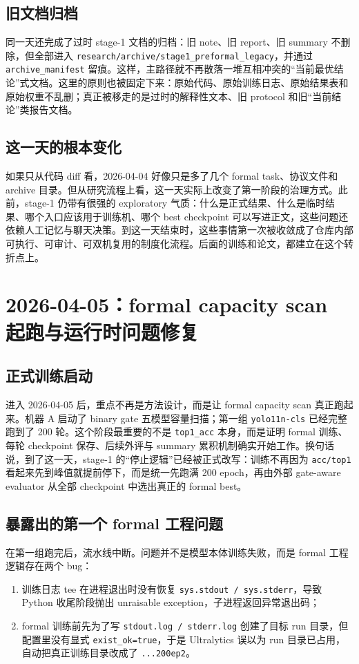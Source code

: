 \documentclass[UTF8,12pt]{ctexart}
\newcommand{\reportdate}[1]{\section{#1}}
\begin{document}
\subsection{旧文档归档}
同一天还完成了过时 stage-1 文档的归档：旧 note、旧 report、旧 summary 不删除，但全部进入 \texttt{research/archive/stage1\_preformal\_legacy}，并通过 \texttt{archive\_manifest} 留痕。这样，主路径就不再散落一堆互相冲突的“当前最优结论”式文档。这里的原则也被固定下来：原始代码、原始训练日志、原始结果表和原始权重不乱删；真正被移走的是过时的解释性文本、旧 protocol 和旧“当前结论”类报告文档。

\subsection{这一天的根本变化}
如果只从代码 diff 看，2026-04-04 好像只是多了几个 formal task、协议文件和 archive 目录。但从研究流程上看，这一天实际上改变了第一阶段的治理方式。此前，stage-1 仍带有很强的 exploratory 气质：什么是正式结果、什么是临时结果、哪个入口应该用于训练机、哪个 best checkpoint 可以写进正文，这些问题还依赖人工记忆与聊天决策。到这一天结束时，这些事情第一次被收敛成了仓库内部可执行、可审计、可双机复用的制度化流程。后面的训练和论文，都建立在这个转折点上。

\reportdate{2026-04-05：formal capacity scan 起跑与运行时问题修复}

\subsection{正式训练启动}
进入 2026-04-05 后，重点不再是方法设计，而是让 formal capacity scan 真正跑起来。机器 A 启动了 binary gate 五模型容量扫描；第一组 \texttt{yolo11n-cls} 已经完整跑到了 200 轮。这个阶段最重要的不是 \texttt{top1\_acc} 本身，而是证明 formal 训练、每轮 checkpoint 保存、后续外评与 summary 累积机制确实开始工作。换句话说，到了这一天，stage-1 的“停止逻辑”已经被正式改写：训练不再因为 \texttt{acc/top1} 看起来先到峰值就提前停下，而是统一先跑满 200 epoch，再由外部 gate-aware evaluator 从全部 checkpoint 中选出真正的 formal best。

\subsection{暴露出的第一个 formal 工程问题}
在第一组跑完后，流水线中断。问题并不是模型本体训练失败，而是 formal 工程逻辑存在两个 bug：
\begin{enumerate}[label=\arabic*.]
    \item 训练日志 tee 在进程退出时没有恢复 \texttt{sys.stdout / sys.stderr}，导致 Python 收尾阶段抛出 unraisable exception，子进程返回异常退出码；
    \item formal 训练前先为了写 \texttt{stdout.log / stderr.log} 创建了目标 run 目录，但配置里没有显式 \texttt{exist\_ok=true}，于是 Ultralytics 误以为 run 目录已占用，自动把真正训练目录改成了 \texttt{...200ep2}。
\end{enumerate}
\end{document}
